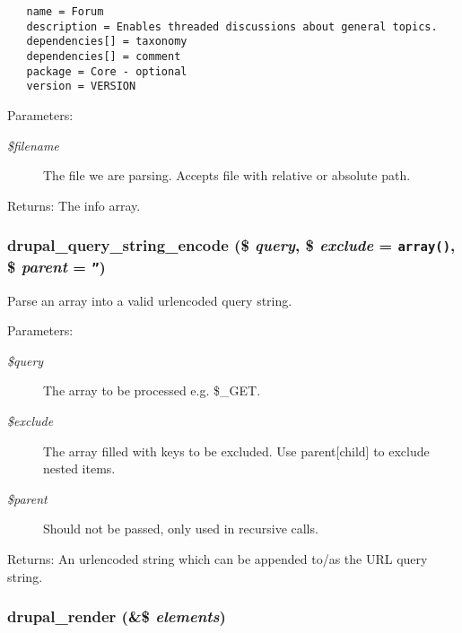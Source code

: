 \begin{Code}\begin{verbatim}   name = Forum
   description = Enables threaded discussions about general topics.
   dependencies[] = taxonomy
   dependencies[] = comment
   package = Core - optional
   version = VERSION
\end{verbatim}
\end{Code}



\begin{Desc}
\item[Parameters:]
\begin{description}
\item[{\em \$filename}]The file we are parsing. Accepts file with relative or absolute path. \end{description}
\end{Desc}
\begin{Desc}
\item[Returns:]The info array. \end{Desc}
\hypertarget{common_8inc_1bd761730fc16bd2122dff2790c2842f}{
\subsubsection[{drupal\_\-query\_\-string\_\-encode}]{\setlength{\rightskip}{0pt plus 5cm}drupal\_\-query\_\-string\_\-encode (\$ {\em query}, \/  \$ {\em exclude} = {\tt array()}, \/  \$ {\em parent} = {\tt ''})}}
\label{common_8inc_1bd761730fc16bd2122dff2790c2842f}


Parse an array into a valid urlencoded query string.

\begin{Desc}
\item[Parameters:]
\begin{description}
\item[{\em \$query}]The array to be processed e.g. \$\_\-GET. \item[{\em \$exclude}]The array filled with keys to be excluded. Use parent\mbox{[}child\mbox{]} to exclude nested items. \item[{\em \$parent}]Should not be passed, only used in recursive calls. \end{description}
\end{Desc}
\begin{Desc}
\item[Returns:]An urlencoded string which can be appended to/as the URL query string. \end{Desc}
\hypertarget{common_8inc_05798b44e8d6c496d4bee5cc32fa7851}{
\subsubsection[{drupal\_\-render}]{\setlength{\rightskip}{0pt plus 5cm}drupal\_\-render (\&\$ {\em elements})}}
\label{common_8inc_05798b44e8d6c496d4bee5cc32fa7851}


